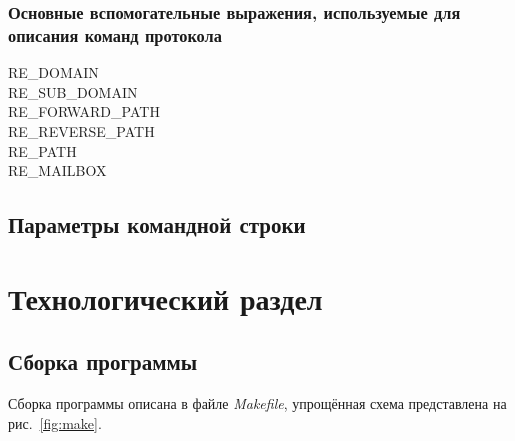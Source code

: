 \documentclass[a4paper,12pt]{report}
\begin{document}
\subsection{ Основные вспомогательные выражения, используемые для описания команд протокола}
\begin{description}
\item[RE\_DOMAIN]

\item[RE\_SUB\_DOMAIN]

\item[RE\_FORWARD\_PATH]

\item[RE\_REVERSE\_PATH]

\item[RE\_PATH]

\item[RE\_MAILBOX]

\end{description}



\section{Параметры командной строки}



% 

\chapter{Технологический раздел}


\section{Сборка программы}

Сборка программы описана в файле \textit{Makefile}, упрощённая схема представлена на рис.~\ref{fig:make}.
\end{document}
